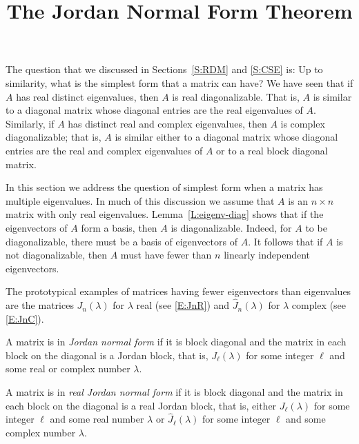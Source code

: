 \documentclass{ximera}
\title{The Jordan Normal Form Theorem}
\begin{document}
\begin{abstract}
\end{abstract}
\maketitle


\label{S:JNF}

The question that we discussed in Sections~\ref{S:RDM} and \ref{S:CSE} is: 
Up to similarity, what is the simplest form that a matrix can have?  
We have seen that if $A$ has real distinct eigenvalues, then $A$ is real 
diagonalizable.  That is, $A$ is similar to a diagonal matrix whose 
diagonal entries are the real eigenvalues of $A$.  Similarly, if $A$ has 
distinct real and complex eigenvalues, then $A$ is complex diagonalizable; 
that is, $A$ is similar either to a diagonal matrix whose diagonal entries 
are the real and complex eigenvalues of $A$ or to a real block diagonal 
matrix.

In this section we address the question of simplest form when a
matrix has multiple eigenvalues.  In much of this discussion we assume
that $A$ is an $n\times n$ matrix with only real eigenvalues.  
Lemma~\ref{L:eigenv-diag} shows that if the eigenvectors of 
$A$ form a basis, then $A$ is diagonalizable. Indeed, for $A$ to be
diagonalizable, there must be a basis of eigenvectors of $A$.  It 
follows that if $A$ is not diagonalizable, then $A$ must have fewer
than $n$ linearly independent 
eigenvectors.  

The prototypical examples of matrices having fewer eigenvectors than 
eigenvalues are the matrices $J_n(\lambda)$ for $\lambda$ real (see
\eqref{E:JnR}) and $\widehat{J}_n(\lambda)$ for $\lambda$ complex (see
\eqref{E:JnC}).
\begin{definition} 
A matrix is in {\em Jordan normal form\/} if it is block diagonal and 
the matrix in each block on the diagonal is a Jordan block, that is, 
$J_\ell(\lambda)$ for some integer $\ell$ and some real or complex number 
$\lambda$.  

A matrix is in {\em real Jordan normal form\/} if it is block diagonal 
and the matrix in each block on the diagonal is a real Jordan block, that is, 
either $J_\ell(\lambda)$ for some integer $\ell$ and some real number 
$\lambda$ or $\widehat{J}_\ell(\lambda)$ for some integer $\ell$ and some 
complex number $\lambda$. 
\end{definition} 
\end{document}
